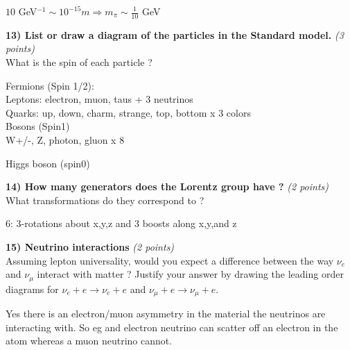 {$10$ GeV$^{-1} \sim 10^{-15} m  \Rightarrow m_\pi \sim \frac{1}{10} $ GeV


\vspace*{0.3in}

\textbf{13) List or draw a diagram of the particles in the Standard model. } \hfill \textit{(3 points)}\\
What is the spin of each particle ?

Fermions (Spin 1/2): \\

Leptons:  electron, muon, taus + 3 neutrinos\\
Quarks: up, down, charm, strange, top, bottom x 3 colors\\

Bosons (Spin1)\\
  W+/-,  Z,  photon,  gluon x 8

Higgs boson (spin0)

\vspace*{0.3in}

\textbf{14)  How many generators does the Lorentz group have ? }\hfill \textit{(2 points)}\\
What transformations do they correspond to ?

6:  3-rotations about x,y,z  and 3 boosts along x,y,and z

\vspace*{0.3in}

\textbf{15) Neutrino interactions } \hfill \textit{(2 points)}\\
Assuming lepton universality, would you expect a difference between the way $\nu_e$ and $\nu_\mu$ interact with matter ?
Justify your answer by drawing the leading order diagrams for $\nu_e + e \rightarrow \nu_e + e$  and $\nu_\mu + e \rightarrow \nu_\mu + e$.

Yes there is an electron/muon asymmetry in the material the neutrinos are interacting with.
So eg and electron neutrino can scatter off an electron in the atom whereas a muon neutrino cannot.

\clearpage

}
